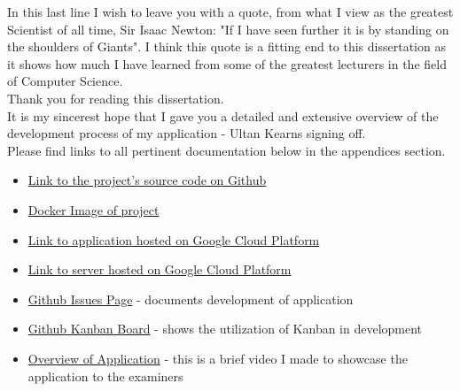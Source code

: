 In this last line I wish to leave you with a quote, from what I view as the greatest Scientist of all time, Sir Isaac Newton: "If I have seen further it is by standing on the shoulders of Giants"\cite{Newton}.  I think this quote is a fitting end to this dissertation as it shows how much I have learned from some of the greatest lecturers in the field of Computer Science.
\\
Thank you for reading this dissertation.
\\
It is my sincerest hope that I gave you a detailed and extensive overview of the development process of my application - Ultan Kearns signing off.
\\
Please find links to all pertinent documentation below in the appendices section.
\begin{appendices}
\begin{itemize}
\item \href{https://github.com/Ultan-Kearns/AppliedProject}{Link to the project's source code on Github}
\item \href{https://hub.docker.com/repository/docker/ultan/applied-project}{Docker Image of project}
\item \href{https://34.68.75.97:3000/}{Link to application hosted on Google Cloud Platform}
\item \href{https://34.68.75.97:8080/}{Link to server hosted on Google Cloud Platform}
\item \href{https://github.com/Ultan-Kearns/AppliedProject/issues}{Github Issues Page} - documents development of application
\item \href{https://github.com/Ultan-Kearns/AppliedProject/projects/3}{Github Kanban Board} - shows the utilization of Kanban in development
\item \href{https://www.youtube.com/watch?v=AiM4veddx70}{Overview of Application} - this is a brief video I made to showcase the application to the examiners
\end{itemize}
\end{appendices}



